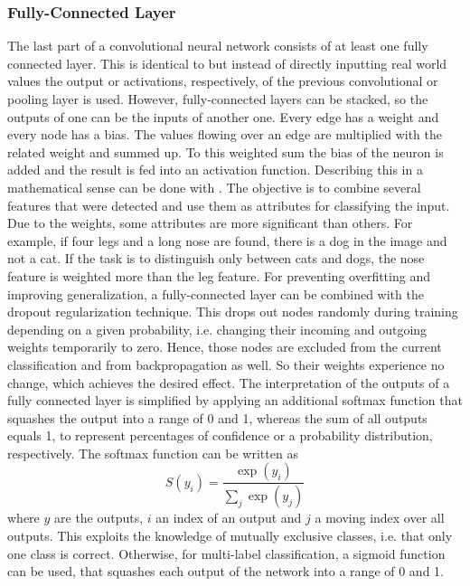 \subsubsection{Fully-Connected Layer}
\label{sec:cnn-fully-connected}
The last part of a convolutional neural network consists of at least one fully connected layer.
This is identical to  but instead of directly inputting real world values the output or activations, respectively, of the previous convolutional or pooling layer is used.
However, fully-connected layers can be stacked, so the outputs of one can be the inputs of another one.
Every edge has a weight and every node has a bias.
The values flowing over an edge are multiplied with the related weight and summed up.
To this weighted sum the bias of the neuron is added and the result is fed into an activation function.
Describing this in a mathematical sense can be done with .
The objective is to combine several features that were detected and use them as attributes for classifying the input.
Due to the weights, some attributes are more significant than others.
For example, if four legs and a long nose are found, there is a dog in the image and not a cat.
If the task is to distinguish only between cats and dogs, the nose feature is weighted more than the leg feature.
For preventing overfitting and improving generalization, a fully-connected layer can be combined with the dropout regularization technique\cite{Srivastava:2014:DSW:2627435.2670313}.
This drops out nodes randomly during training depending on a given probability, i.e. changing their incoming and outgoing weights temporarily to zero.
Hence, those nodes are excluded from the current classification and from backpropagation as well.
So their weights experience no change, which achieves the desired effect.
The interpretation of the outputs of a fully connected layer is simplified by applying an additional softmax function that squashes the output into a range of 0 and 1, whereas the sum of all outputs equals 1, to represent percentages of confidence or a probability distribution, respectively\cite{Bishop2006}.
The softmax function can be written as
\begin{equation}
	\label{eq:softmax}
	S(y_i) = \frac{\exp(y_i)}{\sum_{j} \exp(y_j)}
\end{equation}
where $y$ are the outputs, $i$ an index of an output and $j$ a moving index over all outputs.
This exploits the knowledge of mutually exclusive classes, i.e. that only one class is correct.
Otherwise, for multi-label classification, a sigmoid function can be used, that squashes each output of the network into a range of 0 and 1.